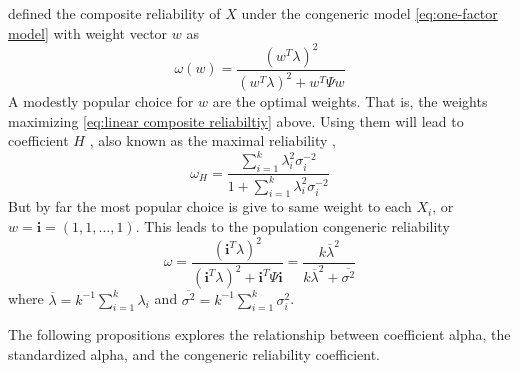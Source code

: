 \documentclass{article}
\theoremstyle{plain}
\theoremstyle{plain}
\theoremstyle{definition}
\theoremstyle{remark}
\theoremstyle{definition}
\theoremstyle{plain}
\theoremstyle{plain}
\theoremstyle{definition}
\begin{document}
\citet[][p. 112]{Joreskog1971-nn} defined the composite reliability of $X$ under the congeneric model \eqref{eq:one-factor model} with weight vector $w$ as 
\begin{equation}
\label{eq:linear composite reliabiltiy}
\omega(w) = \frac{(w^T\lambda)^2}{(w^T\lambda)^2 + w^T \Psi w}
\end{equation}
A modestly popular choice for $w$ are the optimal weights. That is, the weights maximizing \eqref{eq:linear composite reliabiltiy} above. Using them will lead to coefficient $H$ \citep{hancock2001rethinking}, also known as the maximal reliability \citep{Li1997-yh}, 
\begin{equation}
\label{eq:coefficient_H}
\omega_H=\frac{\sum_{i=1}^{k}\lambda_{i}^{2}\sigma_{i}^{-2}}{1+\sum_{i=1}^{k}\lambda_{i}^{2}\sigma_{i}^{-2}}
\end{equation}
But by far the most popular choice is give to same weight to each $X_i$, or $w = \mathbf{i}=\left(1,1,\ldots,1\right)$. This leads to the population congeneric reliability
\begin{equation}
\omega =\frac{(\mathbf{i}^T\lambda)^2}{(\mathbf{i}^T\lambda)^2 + \mathbf{i}^T\Psi\mathbf{i}} =\frac{k\overline{\lambda}^{2}}{k\overline{\lambda}^{2}+\overline{\sigma^{2}}}\label{eq:Congeneric reliability}
\end{equation}
where $\overline{\lambda}=k^{-1}\sum_{i=1}^{k}\lambda_{i}$ and
$\overline{\sigma^{2}}=k^{-1}\sum_{i=1}^{k}\sigma_{i}^{2}$.

The following propositions explores the relationship between coefficient alpha, the standardized alpha, and the congeneric reliability coefficient.
\end{document}
